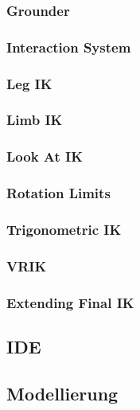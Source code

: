 \subsubsection{Grounder}
\subsubsection{Interaction System}
\subsubsection{Leg IK}
\subsubsection{Limb IK}
\subsubsection{Look At IK}
\subsubsection{Rotation Limits}
\subsubsection{Trigonometric IK}
\subsubsection{VRIK}
\subsubsection{Extending Final IK}


\subsection{IDE}

\subsection{Modellierung}
